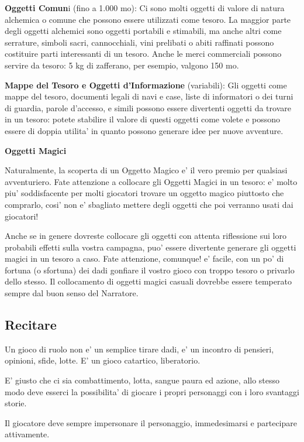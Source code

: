 \documentclass[a4paper,11pt,twoside,openany]{dndbook}
\begin{document}
\textbf{Oggetti Comun}i (fino a 1.000 mo): Ci sono molti oggetti di valore di natura alchemica o comune che possono essere utilizzati come tesoro. La maggior parte degli oggetti alchemici sono oggetti portabili e stimabili, ma anche altri come serrature, simboli sacri, cannocchiali, vini prelibati o abiti raffinati possono costituire parti interessanti di un tesoro. Anche le merci commerciali possono servire da tesoro: 5 kg di zafferano, per esempio, valgono 150 mo.

\textbf{Mappe del Tesoro e Oggetti d'Informazione} (variabili): Gli oggetti come mappe del tesoro, documenti legali di navi e case, liste di informatori o dei turni di guardia, parole d'accesso, e simili possono essere divertenti oggetti da trovare in un tesoro: potete stabilire il valore di questi oggetti come volete e possono essere di doppia utilita' in quanto possono generare idee per nuove avventure.

\textbf{Oggetti Magici}

Naturalmente, la scoperta di un Oggetto Magico e' il vero premio per qualsiasi avventuriero. Fate attenzione a collocare gli Oggetti Magici in un tesoro: e' molto piu' soddisfacente per molti giocatori trovare un oggetto magico piuttosto che comprarlo, cosi' non e' sbagliato mettere degli oggetti che poi verranno usati dai giocatori!

Anche se in genere dovreste collocare gli oggetti con attenta riflessione sui loro probabili effetti sulla vostra campagna, puo' essere divertente generare gli oggetti magici in un tesoro a caso. Fate attenzione, comunque! e' facile, con un po' di fortuna (o sfortuna) dei dadi gonfiare il vostro gioco con troppo tesoro o privarlo dello stesso. Il collocamento di oggetti magici casuali dovrebbe essere temperato sempre dal buon senso del Narratore.

\subsection{Recitare}

\label{recitare}

Un gioco di ruolo non e' un semplice tirare dadi, e' un incontro di pensieri, opinioni, sfide, lotte. E' un gioco catartico, liberatorio.

E' giusto che ci sia combattimento, lotta, sangue paura ed azione, allo stesso modo deve esserci la possibilita' di giocare i propri personaggi con i loro svantaggi storie.

Il giocatore deve sempre impersonare il personaggio, immedesimarsi e partecipare attivamente.
\end{document}
